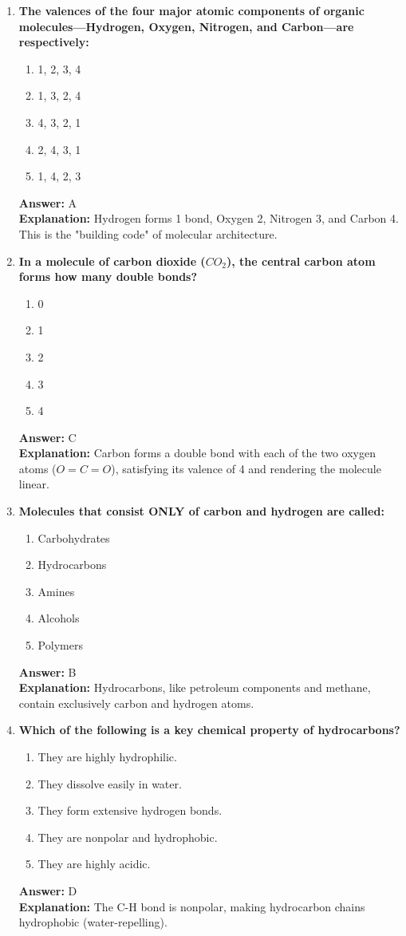 \documentclass[11pt, a4paper]{article}
\begin{document}
\begin{enumerate}
\item \textbf{The valences of the four major atomic components of organic molecules—Hydrogen, Oxygen, Nitrogen, and Carbon—are respectively:}
\begin{enumerate}[label=\Alph*.]
    \item 1, 2, 3, 4
    \item 1, 3, 2, 4
    \item 4, 3, 2, 1
    \item 2, 4, 3, 1
    \item 1, 4, 2, 3
\end{enumerate}
\textbf{Answer:} A \\
\textbf{Explanation:} Hydrogen forms 1 bond, Oxygen 2, Nitrogen 3, and Carbon 4. This is the "building code" of molecular architecture.

\item \textbf{In a molecule of carbon dioxide ($CO_2$), the central carbon atom forms how many double bonds?}
\begin{enumerate}[label=\Alph*.]
    \item 0
    \item 1
    \item 2
    \item 3
    \item 4
\end{enumerate}
\textbf{Answer:} C \\
\textbf{Explanation:} Carbon forms a double bond with each of the two oxygen atoms ($O=C=O$), satisfying its valence of 4 and rendering the molecule linear.

\item \textbf{Molecules that consist ONLY of carbon and hydrogen are called:}
\begin{enumerate}[label=\Alph*.]
    \item Carbohydrates
    \item Hydrocarbons
    \item Amines
    \item Alcohols
    \item Polymers
\end{enumerate}
\textbf{Answer:} B \\
\textbf{Explanation:} Hydrocarbons, like petroleum components and methane, contain exclusively carbon and hydrogen atoms.

\item \textbf{Which of the following is a key chemical property of hydrocarbons?}
\begin{enumerate}[label=\Alph*.]
    \item They are highly hydrophilic.
    \item They dissolve easily in water.
    \item They form extensive hydrogen bonds.
    \item They are nonpolar and hydrophobic.
    \item They are highly acidic.
\end{enumerate}
\textbf{Answer:} D \\
\textbf{Explanation:} The C-H bond is nonpolar, making hydrocarbon chains hydrophobic (water-repelling).


\end{enumerate}
\end{document}
